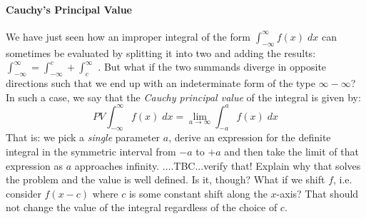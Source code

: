 



\paragraph{Cauchy's Principal Value}
We have just seen how an improper integral of the form $\int_{-\infty}^{\infty} f(x) \; dx$ can sometimes be evaluated by splitting it into two and adding the results:  $\int_{-\infty}^{\infty} = \int_{-\infty}^c + \int_c^{\infty}$ . But what if the two summands diverge in opposite directions such that we end up with an indeterminate form of the type $\infty - \infty$? In such a case, we say that the \emph{Cauchy principal value} of the integral is given by:
\begin{equation}
PV \int_{-\infty}^{\infty} f(x) \; dx = \lim_{a \rightarrow \infty} \int_{-a}^a f(x) \; dx
\end{equation}
That is: we pick a \emph{single} parameter $a$, derive an expression for the definite integral in the symmetric interval from $-a$ to $+a$ and then take the limit of that expression as $a$ approaches infinity. ....TBC...verify that! Explain why that solves the problem and the value is well defined. Is it, though? What if we shift $f$, i.e. consider $f(x-c)$ where $c$ is some constant shift along the $x$-axis? That should not change the value of the integral regardless of the choice of $c$.



